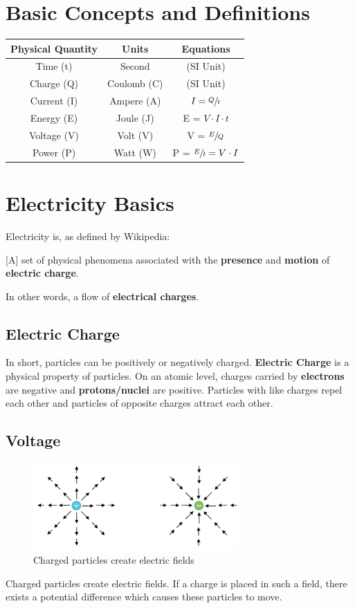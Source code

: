 \documentclass{article}
\begin{document}
\section{Basic Concepts and Definitions}

\begin{tabular}{c|c|c}
    Physical Quantity & Units & Equations \\
    \hline
    Time (t)  & Second & (SI Unit) \\
    Charge (Q) & Coulomb (C) & (SI Unit) \\
    Current (I) & Ampere (A) & $I = \sfrac{Q}{t}$ \\
    Energy (E) & Joule (J) & E = $V \cdot I \cdot t$ \\
    Voltage (V) & Volt (V) & V = $\sfrac{E}{Q}$ \\
    Power (P) & Watt (W) & P = $\sfrac{E}{t} = V \cdot I$ \\
\end{tabular}

\section{Electricity Basics}
Electricity is, as defined by Wikipedia:
\begin{center}
   [A] set of physical phenomena associated with the \textbf{presence} and \textbf{motion} of \textbf{electric charge}.
\end{center}

In other words, a flow of \textbf{electrical charges}.

\subsection{Electric Charge}
In short, particles can be positively or negatively charged. 
\textbf{Electric Charge} is a physical property of particles. On an atomic level, charges carried by \textbf{electrons} are negative and \textbf{protons/nuclei} are positive. Particles with like charges repel each other and particles of opposite charges attract each other.

\subsection{Voltage}
\begin{figure} [h]
    \centering
    \includegraphics[width=0.7\textwidth]{img/E_Field.png}
    \caption{Charged particles create electric fields}
    \label{fig:E_Field}
\end{figure}
Charged particles create electric fields. If a charge is placed in such a field, there exists a potential difference which causes these particles to move.
\end{document}

